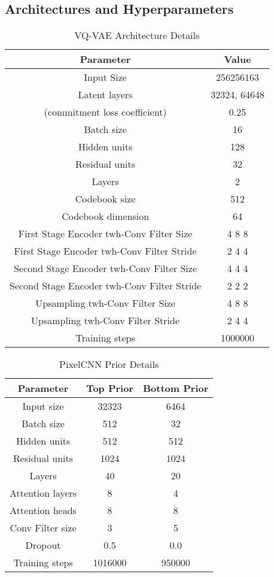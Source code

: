 \documentclass{article}
\begin{document}
\subsection{Architectures and Hyperparameters}
\begin{table}[h!]
  \caption{VQ-VAE Architecture Details}
  \centering
  \begin{tabular}{cc}
    \toprule
    Parameter     & Value \\
    \midrule
    Input Size & 256256163 \\
    Latent layers & 32324, 64648 \\
 (commitment loss coefficient) & 0.25 \\
Batch size & 16 \\
Hidden units & 128 \\
Residual units & 32 \\
Layers & 2 \\
Codebook size & 512 \\
Codebook dimension & 64 \\
First Stage Encoder twh-Conv Filter Size & 4 8 8 \\
First Stage Encoder twh-Conv Filter Stride & 2 4 4 \\
Second Stage Encoder twh-Conv Filter Size & 4 4 4 \\
Second Stage Encoder twh-Conv Filter Stride & 2 2 2 \\
Upsampling twh-Conv Filter Size & 4 8 8 \\
Upsampling twh-Conv Filter Stride & 2 4 4 \\
Training steps & 1000000 \\
    \bottomrule
  \end{tabular}
  \label{arch:1}
\end{table}

\begin{table}[t!]
  \caption{PixelCNN Prior Details}
  \centering
  \begin{tabular}{ccc}
    \toprule
    Parameter     & Top Prior & Bottom Prior \\
    \midrule
Input size & 32323 & 6464 \\
Batch size & 512 & 32 \\
Hidden units & 512 & 512 \\
Residual units & 1024 & 1024 \\
Layers & 40 & 20 \\
Attention layers & 8 & 4 \\
Attention heads & 8 & 8 \\
Conv Filter size & 3 & 5 \\
Dropout & 0.5 & 0.0 \\
Training steps & 1016000 & 950000 \\ 
\bottomrule
  \end{tabular}
  \label{arch:2}
\end{table}
\end{document}
